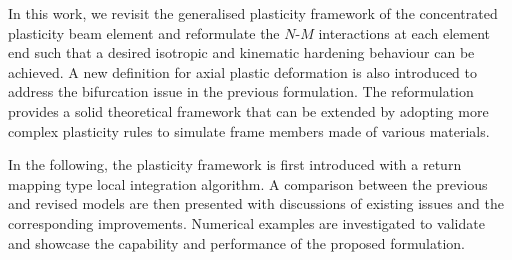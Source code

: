 In this work, we revisit the generalised plasticity framework of the concentrated plasticity beam element and reformulate the $N$-$M$ interactions at each element end such that a desired isotropic and kinematic hardening behaviour can be achieved.
A new definition for axial plastic deformation is also introduced to address the bifurcation issue in the previous formulation.
The reformulation provides a solid theoretical framework that can be extended by adopting more complex plasticity rules to simulate frame members made of various materials.

In the following, the plasticity framework is first introduced with a return mapping type local integration algorithm.
A comparison between the previous \citep{Kostic:et:al:11:EfficientBCElem0} and revised models are then presented with discussions of existing issues and the corresponding improvements.
Numerical examples are investigated to validate and showcase the capability and performance of the proposed formulation.
%
%
%
